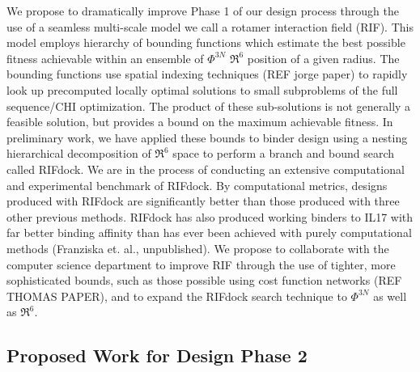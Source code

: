 \documentclass{article}
\begin{document}
We propose to dramatically improve Phase 1 of our design process through the use
of a seamless multi-scale model we call a rotamer interaction field (RIF). This
model employs hierarchy of bounding functions which estimate the best possible
fitness achievable within an ensemble of $\Phi^{3N}$ $\Re^6$ position of a given radius.
The
bounding functions use spatial indexing techniques (REF jorge paper) to rapidly
look up precomputed locally optimal solutions to small subproblems of the full
sequence/CHI optimization. The product of these sub-solutions is not generally a
feasible solution, but provides a bound on the maximum achievable fitness. In
preliminary work, we have applied these bounds to binder design using a nesting
hierarchical decomposition of $\Re^6$ space to perform a branch and bound search
called RIFdock. We are in the process of conducting an extensive computational
and experimental benchmark of RIFdock. By computational metrics, designs
produced with RIFdock are significantly better than those produced with three
other previous methods. RIFdock has also produced working binders to IL17 with
far better binding affinity than has ever been achieved with purely
computational methods (Franziska et. al., unpublished). We propose to
collaborate with the computer science department to improve RIF through the use
of tighter, more sophisticated bounds, such as those possible using cost
function networks (REF THOMAS PAPER), and to expand the RIFdock search technique
to $\Phi^{3N}$ as well as $\Re^6$.

\subsection{Proposed Work for Design Phase 2}\label{proposed2}
\end{document}
